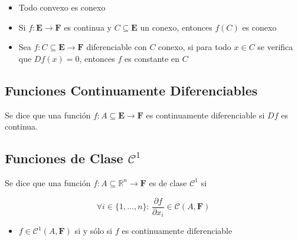 \begin{itemize}
    \item Todo convexo es conexo
    \item Si $f:\mathbf{E}\to\mathbf{F}$ es continua y $C\subseteq\mathbf{E}$ un conexo, entonces $f(C)$ es conexo
    \item Sea $f:C\subseteq\mathbf{E}\to\mathbf{F}$ diferenciable con $C$ conexo, si para todo $x\in C$ se verifica que $Df(x)=0$, entonces $f$ es constante en $C$
\end{itemize}

\subsection{Funciones Continuamente Diferenciables}

Se dice que una función $f:A\subseteq\mathbf{E}\to\mathbf{F}$ es continuamente diferenciable si $Df$ es continua.

\subsection{Funciones de Clase $\mathcal{C}^1$}

Se dice que una función $f:A\subseteq\mathbb{R}^n\to\mathbf{F}$ es de clase $\mathcal{C}^1$ si

\[\forall i\in\{1,...,n\}:\,\frac{\partial f}{\partial x_i}\in \mathcal{C}(A,\mathbf{F})\]

\begin{itemize}
    \item $f\in\mathcal{C}^1(A,\mathbf{F})$ si y sólo si $f$ es continuamente diferenciable
\end{itemize}

\newpage